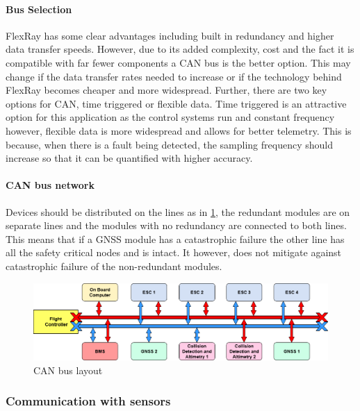 \paragraph{Bus Selection}
FlexRay has some clear advantages including built in redundancy and higher data transfer speeds. However, due to its added complexity, cost and the fact it is compatible with far fewer components a \gls{CAN} bus is the better option. This may change if the data transfer rates needed to increase or if the technology behind FlexRay becomes cheaper and more widespread. Further, there are two key options for \gls{CAN}, time triggered or flexible data. Time triggered is an attractive option for this application as the control systems run and constant frequency however, flexible data is more widespread and allows for better telemetry. This is because, when there is a fault being detected, the sampling frequency should increase so that it can be quantified with higher accuracy.
\paragraph{CAN bus network}
Devices should be distributed on the lines as in \ref{fig:CAN_bus}, the redundant modules are on separate lines and the modules with no redundancy are connected to both lines. This means that if a \gls{GNSS} module has a catastrophic failure the other line has all the safety critical nodes and is intact. It however, does not mitigate against catastrophic failure of the non-redundant modules.
 \begin{figure}[h!]
 \centering
  \includegraphics[width=1\textwidth]{figs/Thomas/Intra Communication/CAN bus.png}
 \caption{CAN bus layout}
 \label{fig:CAN_bus}
 \end{figure}
\paragraph{}

\subsubsection{Communication with sensors}
